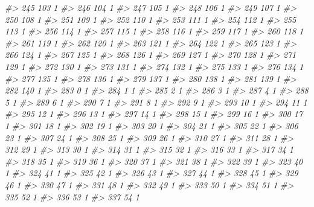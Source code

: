 \documentclass[]{article}
\newenvironment{Shaded}{\begin{snugshade}}{\end{snugshade}}
\newcommand{\CommentTok}[1]{\textcolor[rgb]{0.56,0.35,0.01}{\textit{#1}}}
\begin{document}
\begin{Shaded}
\begin{Highlighting}[]
\CommentTok{#> 245  103  1}
\CommentTok{#> 246  104  1}
\CommentTok{#> 247  105  1}
\CommentTok{#> 248  106  1}
\CommentTok{#> 249  107  1}
\CommentTok{#> 250  108  1}
\CommentTok{#> 251  109  1}
\CommentTok{#> 252  110  1}
\CommentTok{#> 253  111  1}
\CommentTok{#> 254  112  1}
\CommentTok{#> 255  113  1}
\CommentTok{#> 256  114  1}
\CommentTok{#> 257  115  1}
\CommentTok{#> 258  116  1}
\CommentTok{#> 259  117  1}
\CommentTok{#> 260  118  1}
\CommentTok{#> 261  119  1}
\CommentTok{#> 262  120  1}
\CommentTok{#> 263  121  1}
\CommentTok{#> 264  122  1}
\CommentTok{#> 265  123  1}
\CommentTok{#> 266  124  1}
\CommentTok{#> 267  125  1}
\CommentTok{#> 268  126  1}
\CommentTok{#> 269  127  1}
\CommentTok{#> 270  128  1}
\CommentTok{#> 271  129  1}
\CommentTok{#> 272  130  1}
\CommentTok{#> 273  131  1}
\CommentTok{#> 274  132  1}
\CommentTok{#> 275  133  1}
\CommentTok{#> 276  134  1}
\CommentTok{#> 277  135  1}
\CommentTok{#> 278  136  1}
\CommentTok{#> 279  137  1}
\CommentTok{#> 280  138  1}
\CommentTok{#> 281  139  1}
\CommentTok{#> 282  140  1}
\CommentTok{#> 283    0  1}
\CommentTok{#> 284    1  1}
\CommentTok{#> 285    2  1}
\CommentTok{#> 286    3  1}
\CommentTok{#> 287    4  1}
\CommentTok{#> 288    5  1}
\CommentTok{#> 289    6  1}
\CommentTok{#> 290    7  1}
\CommentTok{#> 291    8  1}
\CommentTok{#> 292    9  1}
\CommentTok{#> 293   10  1}
\CommentTok{#> 294   11  1}
\CommentTok{#> 295   12  1}
\CommentTok{#> 296   13  1}
\CommentTok{#> 297   14  1}
\CommentTok{#> 298   15  1}
\CommentTok{#> 299   16  1}
\CommentTok{#> 300   17  1}
\CommentTok{#> 301   18  1}
\CommentTok{#> 302   19  1}
\CommentTok{#> 303   20  1}
\CommentTok{#> 304   21  1}
\CommentTok{#> 305   22  1}
\CommentTok{#> 306   23  1}
\CommentTok{#> 307   24  1}
\CommentTok{#> 308   25  1}
\CommentTok{#> 309   26  1}
\CommentTok{#> 310   27  1}
\CommentTok{#> 311   28  1}
\CommentTok{#> 312   29  1}
\CommentTok{#> 313   30  1}
\CommentTok{#> 314   31  1}
\CommentTok{#> 315   32  1}
\CommentTok{#> 316   33  1}
\CommentTok{#> 317   34  1}
\CommentTok{#> 318   35  1}
\CommentTok{#> 319   36  1}
\CommentTok{#> 320   37  1}
\CommentTok{#> 321   38  1}
\CommentTok{#> 322   39  1}
\CommentTok{#> 323   40  1}
\CommentTok{#> 324   41  1}
\CommentTok{#> 325   42  1}
\CommentTok{#> 326   43  1}
\CommentTok{#> 327   44  1}
\CommentTok{#> 328   45  1}
\CommentTok{#> 329   46  1}
\CommentTok{#> 330   47  1}
\CommentTok{#> 331   48  1}
\CommentTok{#> 332   49  1}
\CommentTok{#> 333   50  1}
\CommentTok{#> 334   51  1}
\CommentTok{#> 335   52  1}
\CommentTok{#> 336   53  1}
\CommentTok{#> 337   54  1}

\end{Highlighting}
\end{Shaded}
\end{document}
